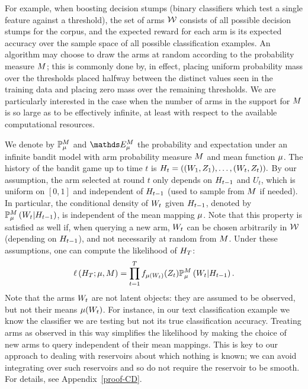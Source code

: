 For example, when boosting decision stumps
(binary classifiers which test a single feature against a threshold),
the set of arms $\mathcal{W}$ consists of all possible decision
stumps for the corpus, and
the expected reward for each arm is its expected accuracy over the sample space 
of all possible classification examples.
An algorithm may choose to draw the arms at random according to the
probability measure $M$;
this is commonly done by, in effect, placing uniform probability mass over the
thresholds placed halfway between the distinct values seen in the training data
and placing zero mass over the remaining thresholds.
We are particularly interested in the case when the number of arms in the
support for $M$ is so large as to be effectively infinite, at least with
respect to the available computational resources.

We denote by $\mathbb{P}_{\mu}^M$ and $\ETrueModelNone$ the probability and 
expectation under an infinite bandit model with arm probability measure
$M$ and mean function $\mu$. The
history of the bandit game up to time $t$ is
$H_t = ((W_1,Z_1),\dots,(W_t,Z_t)).$
By our assumption, the arm selected at round $t$ only depends on
$H_{t-1}$
and $U_t$, which is uniform on $[0,1]$ and independent of
$H_{t-1}$ (used to sample from $M$ if needed).
In particular, the
conditional density of $W_t$ given $H_{t-1}$,
denoted by  $\mathbb{P}_{\mu}^M\left(  W_t | H_{t-1}  \right)$,
is independent of the mean mapping $\mu$. Note that this
property is
satisfied as well if, when querying a new arm, $W_t$ can be chosen
arbitrarily 
in $\mathcal{W}$ (depending on $H_{t-1}$), and not necessarily at random from
$M$. Under these
assumptions, one can compute the likelihood of $H_T$:
%
\vspace{-10pt}
%
\begin{align}
\ell\left(H_T ; \mu,M\right) = \prod_{t=1}^T f_{\mu(W_t)}(Z_t)
\mathbb{P}_{\mu}^M\left(  W_t | H_{t-1}  \right).\label{Likelihood}
\end{align}
Note that the arms $W_t$ are not latent objects: they are assumed to be
observed, but not their means $\mu(W_t)$.
For instance, in our text classification example we know the classifier we are
testing but not its true classification accuracy.
Treating arms as observed in this way simplifies the likelihood by making the
choice of new arms to query independent of their mean mappings.
This is key to our approach to dealing with reservoirs about which nothing
is known; we can avoid integrating over such reservoirs and so do not require
the reservoir to be smooth.
For details, see Appendix~\ref{proof-CD}.

